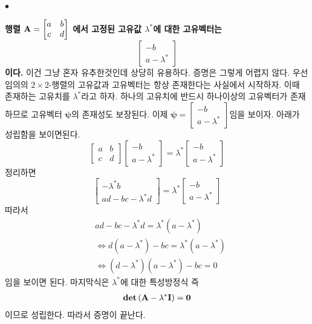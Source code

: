 \documentclass[12pt,oneside,english,a4paper]{article}
\def\ck{\paragraph{\Large$\bullet$}\Large}
\begin{document}
\ck \textbf{행렬 ${\bf A}=\begin{bmatrix} a & b \\ c & d \end{bmatrix}$ 에서 고정된 고유값 $\lambda^* $에 대한 고유벡터는 $$\begin{bmatrix}-b \\ a-\lambda^* \end{bmatrix}$$이다.} 이건 그냥 혼자 유추한것인데 상당히 유용하다. 증명은 그렇게 어렵지 않다. 우선 임의의 $2 \times 2$-행렬의 고유값과 고유벡터는 항상 존재한다는 사실에서 시작하자. 이때 존재하는 고유치를 $\lambda^*$라고 하자. 하나의 고유치에 반드시 하나이상의 고유벡터가 존재하므로 고유벡터 $\boldsymbol \psi$의 존재성도 보장된다. 이제 $\boldsymbol \psi=\begin{bmatrix} -b \\ a-\lambda^* \end{bmatrix}$임을 보이자. 아래가 성립함을 보이면된다.
\[
\begin{bmatrix}a & b \\ c & d \end{bmatrix} \begin{bmatrix} -b \\ a-\lambda^* \end{bmatrix}=\lambda^* \begin{bmatrix} -b \\ a-\lambda^* \end{bmatrix}
\]
정리하면 
\[
\begin{bmatrix} -\lambda^*b \\ ad-bc-\lambda^*d \end{bmatrix}=\lambda^* \begin{bmatrix} -b \\ a-\lambda^* \end{bmatrix}
\]
따라서 
\begin{align*}
& ad-bc-\lambda^*d = \lambda^*(a-\lambda^*) \\ 
& \Longleftrightarrow d(a-\lambda^*)-bc = \lambda^*(a-\lambda^*) \\
& \Longleftrightarrow (d-\lambda^*)(a-\lambda^*)-bc = 0 
\end{align*}
임을 보이면 된다. 마지막식은 $\lambda^*$에 대한 특성방정식 즉 
\begin{align*}
\bf{det}\left({\bf A}-\lambda^* {\bf I}\right)=0
\end{align*}
이므로 성립한다. 따라서 증명이 끝난다. 
\end{document}
